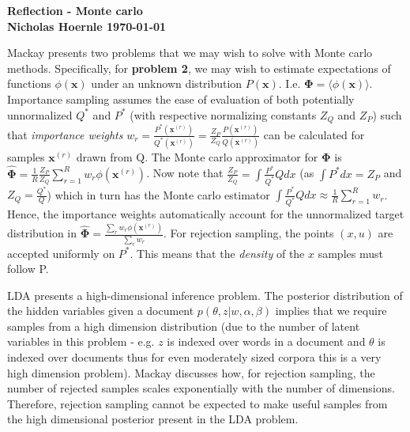 \documentclass[twoside]{article}
\begin{document}
\textbf{Reflection - Monte carlo}\\
\textbf{Nicholas Hoernle \hfill \today}

Mackay presents two problems that we may wish to solve with Monte carlo methods. Specifically, for \textbf{problem 2}, we may wish to estimate expectations of functions $\phi(\mathbf{x})$ under an unknown distribution $P(\mathbf{x})$. I.e. $\mathbf{\Phi} = \langle \phi(\mathbf{x}) \rangle$. Importance sampling assumes the ease of evaluation of both potentially unnormalized $Q^*$ and $P^*$ (with respective normalizing constants $Z_Q$ and $Z_P$) such that \textit{importance weights} $w_r = \frac{P^*(\mathbf{x}^{(r)})}{Q^*(\mathbf{x}^{(r)})} = \frac{Z_P}{Z_Q}\frac{P(\mathbf{x}^{(r)})}{Q(\mathbf{x}^{(r)})}$ can be calculated for samples $\mathbf{x}^{(r)}$ drawn from Q. The Monte carlo approximator for $\mathbf{\Phi}$ is $\mathbf{\hat{\Phi}} = \frac{1}{R} \frac{Z_P}{Z_Q} \sum\limits_{r=1}^{R} w_r \phi(\mathbf{x}^{(r)})$. Now note that $\frac{Z_P}{Z_Q} = \int \frac{P^*}{Q^*}Q dx$ (as $\int P^* dx = Z_P$ and $Z_Q = \frac{Q^*}{Q}$) which in turn has the Monte carlo estimator $\int \frac{P^*}{Q^*}Q dx \approx \frac{1}{R} \sum_{r=1}^{R}w_r$. Hence, the importance weights automatically account for the unnormalized target distribution in $\mathbf{\hat{\Phi}} = \frac{\sum_r w_r \phi(\mathbf{x}^{(r)})}{\sum_r w_r}$. For rejection sampling, the points $(x,u)$ are accepted uniformly on $P^*$. This means that the \textit{density} of the $x$ samples must follow P.

LDA presents a high-dimensional inference problem. The posterior distribution of the hidden variables given a document $p(\theta, z \vert w, \alpha, \beta)$ implies that we require samples from a high dimension distribution (due to the number of latent variables in this problem - e.g. $z$ is indexed over words in a document and $\theta$ is indexed over documents thus for even moderately sized corpora this is a very high dimension problem). Mackay discusses how, for rejection sampling, the number of rejected samples scales exponentially with the number of dimensions. Therefore, rejection sampling cannot be expected to make useful samples from the high dimensional posterior present in the LDA problem.
\end{document}
